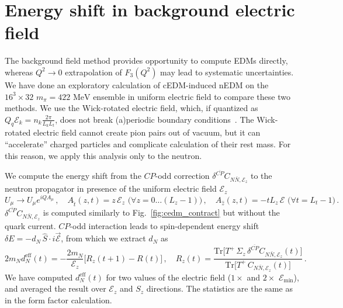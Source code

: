 \documentclass{PoS}
\newcommand{\CP}{{CP}}
\newcommand{\CPbar}{{\overline{CP}}}
\newcommand{\mcE}{{\mathcal E}}
\begin{document}
\section{Energy shift in background electric field}
The background field method provides opportunity to compute EDMs directly, whereas 
$Q^2\to0$ extrapolation of $F_3(Q^2)$ may lead to systematic uncertainties.
We have done an exploratory calculation of cEDM-induced nEDM on the $16^3\times32$
$m_\pi=422\text{ MeV}$ ensemble in uniform electric field to compare these two methods.
We use the Wick-rotated electric field, which, if quantized as 
$Q_q \mcE_k=n_k\frac{2\pi}{L_k L_t}$, does not break (a)periodic boundary
conditions~\cite{Detmold:2009dx}.
The Wick-rotated electric field cannot create pion pairs out of vacuum, but 
it can ``accelerate'' charged particles and complicate calculation of their rest mass.
For this reason, we apply this analysis only to the neutron.

We compute the energy shift from the $\CP$-odd correction $\delta^\CPbar C_{N\bar N,\mcE_z}$ 
to the neutron propagator in presence of the uniform electric field $\mcE_z$
\begin{equation}
U_{\mu}\to U_{\mu} e^{iQA_{\mu}}\,,
\quad
A_{\hat t}(z,t) = z\, \mcE_z \,\, \big(\forall z=0\ldots (L_z-1)\big)\,,
\quad
A_{\hat z}(z,t) = -t L_z\,\mcE \,\,\big(\forall t=L_t-1)\,.
\end{equation}
$\delta^\CPbar C_{N\bar N,\mcE_z}$ is computed similarly to Fig.~\ref{fig:cedm_contract}
but without the quark current.
$\CP$-odd interaction leads to spin-dependent energy shift
$\delta E = - d_N \, \hat S\cdot i\vec\mcE$, from which we extract $d_N$ as 
\begin{equation}
\label{eqn:dneff}
2 m_N d_N^\text{eff}(t) = -\frac{2m_N}{\mcE_z} \big[R_z(t+1) - R(t)\big]\,,
\quad R_z(t) = \frac{\mathrm{Tr}\big[ T^+ \,\Sigma_z\,\delta^\CPbar C_{N\bar N,\mcE_z}(t)\big]}
                    {\mathrm{Tr}\big[ T^+ \, C_{N\bar N,\mcE_z}(t)\big]}\,.
\end{equation}
We have computed $d_N^\text{eff}(t)$ for two values of the electric field ($1\times$ and $2\times$
$\mcE_\text{min}$), and averaged the result over $\mcE_z$ and $S_z$ directions.
The statistics are the same as in the form factor calculation.
\end{document}
